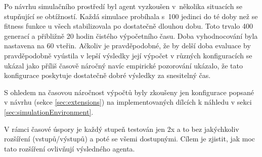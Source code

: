 Po návrhu simulačního prostředí byl agent vyzkoušen v~několika situacích se stupňující se obtížností. Každá simulace probíhala s~100 jedinci do té doby než se fitness funkce u všech stabilizovala po dostatečně dlouhou dobu. Toto trvalo 400 generací a přibližně 20 hodin čistého výpočetního času. Doba vyhodnocování byla nastavena na 60 vteřin. Ačkoliv je pravděpodobné, že by delší doba evaluace by pravděpodobně vyústila v lepší výsledky její výpočet v různých konfiguracích se ukázal jako příliš časově náročný navíc empirické pozorování ukázalo, že tato konfigurace poskytuje dostatečně dobré výsledky za snesitelný čas. 

S ohledem na časovou náročnost výpočtů byly zkoušeny jen konfigurace popsané v návrhu (sekce \ref{sec:extensions}) na implementovaných dílcích k náhledu v sekci \ref{sec:simulationEnvironment}.

V rámci časové úspory je každý stupeň testován jen 2x a to bez jakýchkoliv rozšíření (vstupů/výstupů) a poté se všemi dostupnými. Cílem je zjistit, jak moc tato rozšíření ovlivňují výsledného agenta.

